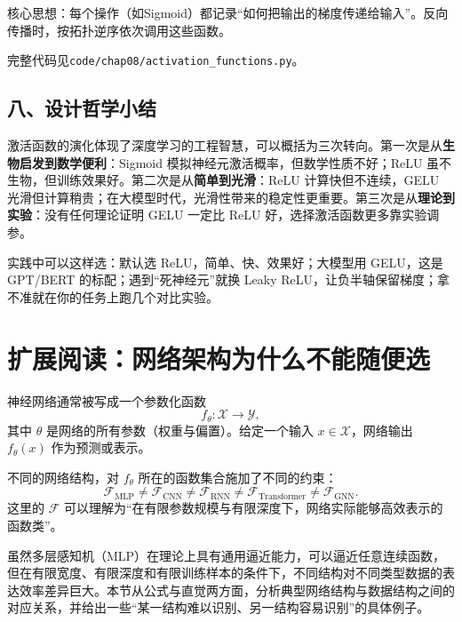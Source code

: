 核心思想：每个操作（如Sigmoid）都记录“如何把输出的梯度传递给输入”。反向传播时，按拓扑逆序依次调用这些函数。

完整代码见\texttt{code/chap08/activation\_functions.py}。

\subsection*{八、设计哲学小结}

激活函数的演化体现了深度学习的工程智慧，可以概括为三次转向。第一次是从\textbf{生物启发到数学便利}：Sigmoid 模拟神经元激活概率，但数学性质不好；ReLU 虽不生物，但训练效果好。第二次是从\textbf{简单到光滑}：ReLU 计算快但不连续，GELU 光滑但计算稍贵；在大模型时代，光滑性带来的稳定性更重要。第三次是从\textbf{理论到实验}：没有任何理论证明 GELU 一定比 ReLU 好，选择激活函数更多靠实验调参。

\begin{insightbox}[title=实践建议]
实践中可以这样选：默认选 ReLU，简单、快、效果好；大模型用 GELU，这是 GPT/BERT 的标配；遇到“死神经元”就换 Leaky ReLU，让负半轴保留梯度；拿不准就在你的任务上跑几个对比实验。
\end{insightbox}

\section*{扩展阅读：网络架构为什么不能随便选}

神经网络通常被写成一个参数化函数
\[
f_\theta : \mathcal{X} \to \mathcal{Y},
\]
其中 $\theta$ 是网络的所有参数（权重与偏置）。给定一个输入 $x\in\mathcal{X}$，网络输出 $f_\theta(x)$ 作为预测或表示。

不同的网络结构，对 $f_\theta$ 所在的函数集合施加了不同的约束：
\[
\mathcal{F}_{\text{MLP}} \neq \mathcal{F}_{\text{CNN}} \neq \mathcal{F}_{\text{RNN}} \neq \mathcal{F}_{\text{Transformer}} \neq \mathcal{F}_{\text{GNN}}.
\]
这里的 $\mathcal{F}$ 可以理解为“在有限参数规模与有限深度下，网络实际能够高效表示的函数类”。

虽然多层感知机（MLP）在理论上具有通用逼近能力，可以逼近任意连续函数，但在有限宽度、有限深度和有限训练样本的条件下，不同结构对不同类型数据的表达效率差异巨大。本节从公式与直觉两方面，分析典型网络结构与数据结构之间的对应关系，并给出一些“某一结构难以识别、另一结构容易识别”的具体例子。

